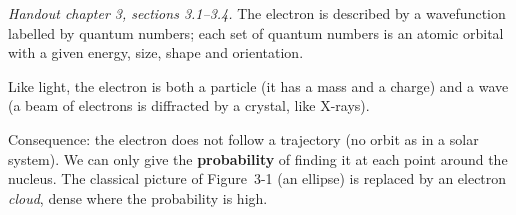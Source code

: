 
\textit{Handout chapter 3, sections 3.1--3.4.} The electron is described by a wavefunction labelled by
quantum numbers; each set of quantum numbers is an atomic orbital with a given energy, size, shape and
orientation.


\begin{concept}
Like light, the electron is both a particle (it has a mass and a charge) and a wave (a beam of electrons
is diffracted by a crystal, like X-rays).
\end{concept}
Consequence: the electron does not follow a trajectory (no orbit as in a solar system). We can only give
the \textbf{probability} of finding it at each point around the nucleus. The classical picture of
Figure~3-1 (an ellipse) is replaced by an electron \emph{cloud}, dense where the probability is high.

